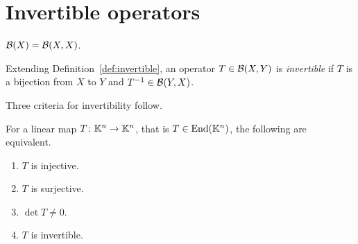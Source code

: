 %
%

\section{Invertible operators}

\begin{notation}\label{not:BX}
$\mathcal{B}(X) = \mathcal{B}(X, X)$.
\end{notation}

\begin{definition}\label{def:invertible-general}
Extending Definition~\ref{def:invertible}, an operator $T \in \mathcal{B}(X, Y)$ is
\emph{invertible} if $T$ is a bijection from $X$ to $Y$ and
$T^{-1} \in \mathcal{B}(Y, X)$.
\end{definition}

Three criteria for invertibility follow.

\begin{proposition}\label{prop:inv-finite}
For a linear map $T \colon \mathbb{K}^n \to \mathbb{K}^n$, that is
$T \in \operatorname{End}(\mathbb{K}^n)$, the following are equivalent.
\begin{enumerate}
  \item $T$ is injective.
  \item $T$ is surjective.
  \item $\det T \ne 0$.
  \item $T$ is invertible.
\end{enumerate}
\end{proposition}

